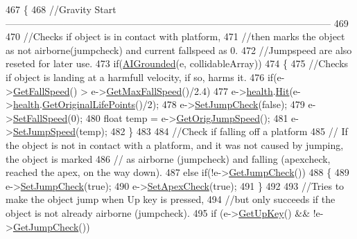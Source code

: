 \begin{DoxyCode}
467 \{
468     \textcolor{comment}{//Gravity
       Start-----------------------------------------------------------------------------------------------------}
469 
470     \textcolor{comment}{//Checks if object is in contact with platform,}
471     \textcolor{comment}{//then marks the object as not airborne(jumpcheck) and current fallspeed as 0.}
472     \textcolor{comment}{//Jumpspeed are also reseted for later use.}
473     \textcolor{keywordflow}{if}(\hyperlink{classPhysics_a4d4fa441923dfc16187236f9f9bb21e0}{AIGrounded}(e, collidableArray))
474     \{
475         \textcolor{comment}{//Checks if object is landing at a harmfull velocity, if so, harms it.}
476         \textcolor{keywordflow}{if}(e->\hyperlink{classAI_a5518f137f504e35a88a16a374c30390b}{GetFallSpeed}() > e->\hyperlink{classAI_a9c878567c39d6a9c293931a679b37ffd}{GetMaxFallSpeed}()/2.4)
477             e->\hyperlink{classAI_a073d65bf0b0b08b31710cf9743d2e364}{health}.\hyperlink{classHealth_a565eec980a98122472e88c57e43b9f16}{Hit}(e->\hyperlink{classAI_a073d65bf0b0b08b31710cf9743d2e364}{health}.\hyperlink{classHealth_a287e046c38875fc1db172318cb1ec291}{GetOriginalLifePoints}()/2);
478         e->\hyperlink{classAI_af70dcfec2f6f98c2113f416895c14214}{SetJumpCheck}(\textcolor{keyword}{false});
479         e->\hyperlink{classAI_ab42bf8c5b4ec0d54423b55e2db524640}{SetFallSpeed}(0);
480         \textcolor{keywordtype}{float} temp = e->\hyperlink{classAI_a028ef0d497fa8f7d9acb93dc7cc7aaf7}{GetOrigJumpSpeed}();
481         e->\hyperlink{classAI_a90247314e34a1d0e1376a27dac61f1c4}{SetJumpSpeed}(temp);
482     \}
483 
484         \textcolor{comment}{//Check if falling off a platform}
485         \textcolor{comment}{// If the object is not in contact with a platform, and it was not caused by jumping, the object is
       marked}
486         \textcolor{comment}{// as airborne (jumpcheck) and falling (apexcheck, reached the apex, on the way down).}
487     \textcolor{keywordflow}{else} \textcolor{keywordflow}{if}(!e->\hyperlink{classAI_a44af0b44c634384d9aa5200b6e1b7427}{GetJumpCheck}())
488     \{
489         e->\hyperlink{classAI_af70dcfec2f6f98c2113f416895c14214}{SetJumpCheck}(\textcolor{keyword}{true});
490         e->\hyperlink{classAI_acb9cc6624a01a27516f68406429f7496}{SetApexCheck}(\textcolor{keyword}{true});
491     \}
492 
493     \textcolor{comment}{//Tries to make the object jump when Up key is pressed,}
494     \textcolor{comment}{//but only succeeds if the object is not already airborne (jumpcheck).}
495     \textcolor{keywordflow}{if} (e->\hyperlink{classAI_a2e3c9d6a73594994858c13bfffaa7450}{GetUpKey}() && !e->\hyperlink{classAI_a44af0b44c634384d9aa5200b6e1b7427}{GetJumpCheck}())

\end{DoxyCode}
